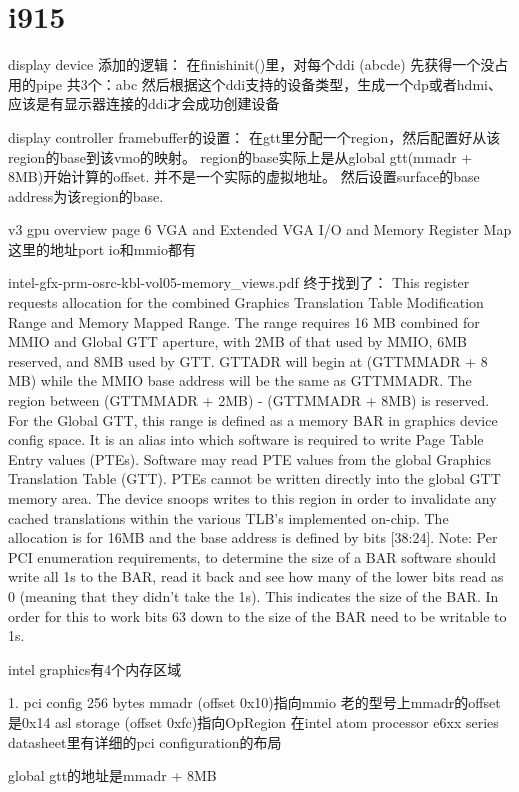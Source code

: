 \section{i915}
display device 添加的逻辑：
在finishinit()里，对每个ddi (abcde)
  先获得一个没占用的pipe 共3个：abc
  然后根据这个ddi支持的设备类型，生成一个dp或者hdmi、
  应该是有显示器连接的ddi才会成功创建设备



display controller framebuffer的设置：
在gtt里分配一个region，然后配置好从该region的base到该vmo的映射。
region的base实际上是从global gtt(mmadr + 8MB)开始计算的offset. 并不是一个实际的虚拟地址。
然后设置surface的base address为该region的base.


v3 gpu overview page 6 VGA and Extended VGA I/O and Memory Register Map
这里的地址port io和mmio都有


intel-gfx-prm-osrc-kbl-vol05-memory_views.pdf
终于找到了：
This register requests allocation for the combined Graphics Translation Table Modification Range and Memory
Mapped Range. The range requires 16 MB combined for MMIO and Global GTT aperture, with 2MB of that used
by MMIO, 6MB reserved, and 8MB used by GTT. GTTADR will begin at (GTTMMADR + 8 MB) while the MMIO
base address will be the same as GTTMMADR. The region between (GTTMMADR + 2MB) - (GTTMMADR + 8MB)
is reserved. For the Global GTT, this range is defined as a memory BAR in graphics device config space. It is an
alias into which software is required to write Page Table Entry values (PTEs). Software may read PTE values from
the global Graphics Translation Table (GTT). PTEs cannot be written directly into the global GTT memory area.
The device snoops writes to this region in order to invalidate any cached translations within the various TLB's
implemented on-chip. The allocation is for 16MB and the base address is defined by bits [38:24]. Note: Per PCI
enumeration requirements, to determine the size of a BAR software should write all 1s to the BAR, read it back
and see how many of the lower bits read as 0 (meaning that they didn't take the 1s). This indicates the size of the
BAR. In order for this to work bits 63 down to the size of the BAR need to be writable to 1s.


intel graphics有4个内存区域

1. pci config 256 bytes
   mmadr (offset 0x10)指向mmio  老的型号上mmadr的offset是0x14
   asl storage (offset 0xfc)指向OpRegion
   在intel atom processor e6xx series datasheet里有详细的pci configuration的布局

   global gtt的地址是mmadr + 8MB

